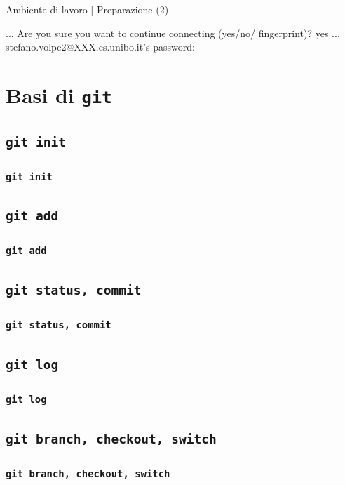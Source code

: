 \documentclass{beamer}
\begin{document}
\begin{frame}{Ambiente di lavoro | Preparazione (2)}
  \begin{semiverbatim}
  \lbrack ...\rbrack \newline
  Are you sure you want to continue connecting \newline (yes/no/\lbrack
  fingerprint\rbrack)? yes \newline
  \lbrack ...\rbrack \newline
  stefano.volpe2@XXX.cs.unibo.it's password:
  \end{semiverbatim}
\end{frame}

\section{Basi di \texttt{git}}

\subsection{\texttt{git init}}
\begin{frame}
  \frametitle{\texttt{git init}}
\end{frame}

\subsection{\texttt{git add}}
\begin{frame}
  \frametitle{\texttt{git add}}
\end{frame}

\subsection{\texttt{git status, commit}}
\begin{frame}
  \frametitle{\texttt{git status, commit}}
\end{frame}

\subsection{\texttt{git log}}
\begin{frame}
  \frametitle{\texttt{git log}}
\end{frame}

\subsection{\texttt{git branch, checkout, switch}}
\begin{frame}
  \frametitle{\texttt{git branch, checkout, switch}}
\end{frame}
\end{document}
